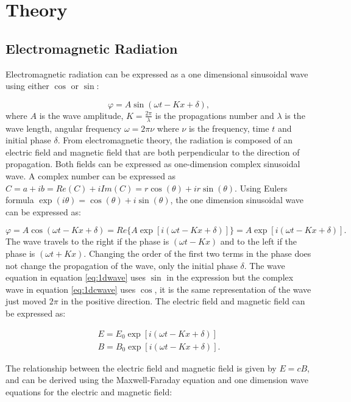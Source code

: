 \documentclass[MasterThesisMain.tex]{subfiles}
\begin{document}
\chapter{Theory}\label{lighttheory}

\section{Electromagnetic Radiation}
Electromagnetic radiation can be expressed as a one dimensional sinusoidal wave using either $\cos$ or $\sin$:

\begin{equation}\label{eq:1dwave}
\varphi = A\sin(\omega t - Kx +\delta),
\end{equation}
where $A$ is the wave amplitude, $K=\frac{2\pi}{\lambda}$ is the propagations number and $\lambda$ is the wave length, angular frequency $\omega = 2\pi\nu$ where $\nu$ is the frequency, time $t$ and initial phase $\delta$.
From electromagnetic theory, the radiation is composed of an electric field and magnetic field that are both perpendicular to the direction of propagation. Both fields can be expressed as one-dimension complex sinusoidal wave. A complex number can be expressed as $C= a + ib =Re(C) + i Im(C) =r\cos(\theta)+ir\sin(\theta)$. Using Eulers formula $\exp(i\theta)=\cos(\theta)+i\sin(\theta)$, the one dimension sinusoidal wave can be expressed as:

\begin{equation}\label{eq:1dcwave}
\varphi=A\cos(\omega t- Kx +\delta) = Re \{A\exp[i(\omega t- Kx +\delta)]\} = A\exp[i(\omega t - Kx + \delta)]. 
\end{equation}
The wave travels to the right if the phase is $(\omega t - Kx)$ and to the left if the phase is $(\omega t + Kx)$. Changing the order of the first two terms in the phase does not change the propagation of the wave, only the initial phase $\delta$. The wave equation in equation \ref{eq:1dwave} uses $\sin$ in the expression but the complex wave in equation \ref{eq:1dcwave} uses $\cos$, it is the same representation of the wave just moved $2\pi$ in the positive direction. The electric field and magnetic field can be expressed as:

\begin{align}
E=E_0\exp[i(\omega t-Kx+\delta)]\\
B=B_0\exp[i(\omega t-Kx+\delta)].
\end{align}

The relationship between the electric field and magnetic field is given by $E=cB$, and can be derived using the Maxwell-Faraday equation and one dimension wave equations for the electric and magnetic field:
\end{document}
